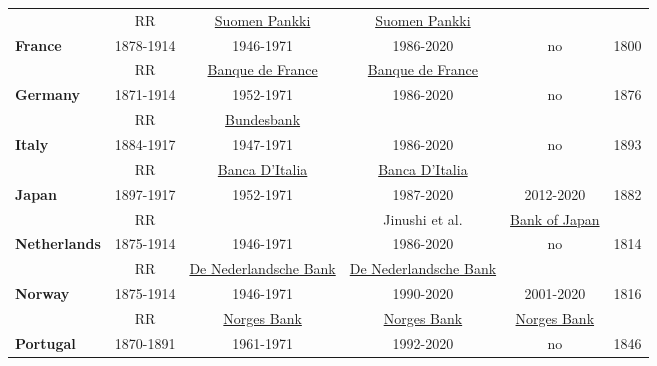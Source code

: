 \begin{landscape}
\begin{table}[]
\begin{longtable}{l*{1}{cccc|c}}
         & RR \citeyear{Reinhart2009} & \href{https://www.suomenpankki.fi/en/bank-of-finland/history/}{Suomen Pankki}  & \href{https://www.suomenpankki.fi/en/bank-of-finland/history/}{Suomen Pankki}  & & \\
[1ex]
\textbf{France}     & 1878-1914  & 1946-1971  & 1986-2020 & no & 1800\\
    & RR \citeyear{Reinhart2009} & \href{https://www.banque-france.fr/en/page-sommaire/history}{Banque de France}  & \href{https://www.banque-france.fr/en/page-sommaire/history}{Banque de France} &  \\
[1ex]
\textbf{Germany} & 1871-1914 & 1952-1971 & 1986-2020 & no & 1876 \\
    & RR \citeyear{Reinhart2009} & \href{https://www.bundesbank.de/de/presse/pressematerial/60-jahre/rechtlicher-rahmen}{Bundesbank}  & \cite{vonHagen1999}   &  \\
[1ex]
\textbf{Italy}  & 1884-1917 & 1947-1971 & 1986-2020 & no & 1893\\
         & RR \citeyear{Reinhart2009}    & \href{https://www.bancaditalia.it/chi-siamo/storia/seconda-guerra-mondiale/index.html}{Banca D'Italia} & \href{https://www.bancaditalia.it/chi-siamo/storia/anni-cinquanta/index.html}{Banca D'Italia} &  \\
[1ex]
\textbf{Japan}  & 1897-1917 & 1952-1971 & 1987-2020 & 2012-2020 & 1882\\
         & RR \citeyear{Reinhart2009} & \cite{Shizume2018} & Jinushi et al. \citeyear{Jinushi2000} & \href{https://www.boj.or.jp/en/announcements/release_2012/k120214b.pdf}{Bank of Japan} & \\
[1ex]
\textbf{Netherlands}  & 1875-1914 & 1946-1971 & 1986-2020 & no & 1814\\
         & RR \citeyear{Reinhart2009} & \href{https://www.dnb.nl/en/about-dnb/organisation/history/index.jsp}{De Nederlandsche Bank} & \href{https://www.dnb.nl/en/about-dnb/organisation/history/index.jsp}{De Nederlandsche Bank} &  & \\
[1ex]
\textbf{Norway}    & 1875-1914 & 1946-1971 & 1990-2020 & 2001-2020 & 1816 \\
    & RR \citeyear{Reinhart2009} & \href{https://www.norges-bank.no/en/topics/about/History/Norges-Banks-history/}{Norges Bank}  & \href{https://www.norges-bank.no/en/topics/about/History/Norges-Banks-history/}{Norges Bank} & \href{https://www.norges-bank.no/en/topics/about/History/Norges-Banks-history/}{Norges Bank} & \\
[1ex]
\textbf{Portugal}  & 1870-1891  & 1961-1971 & 1992-2020 & no & 1846\\

\end{longtable}
\end{table}
\end{landscape}
